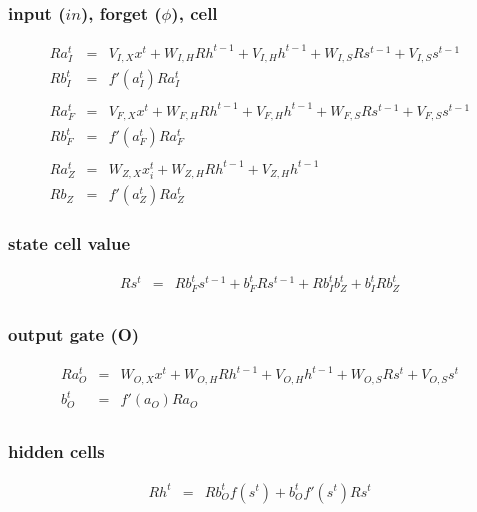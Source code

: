 \documentclass{article}
\begin{document}
\subsubsection{input ($in$), forget ($\phi$), cell}
\begin{eqnarray*}
Ra_{I}^t &=& V_{I,X}x^t + W_{I,H}Rh^{t-1} + V_{I,H}h^{t-1} + W_{I,S}Rs^{t-1} + V_{I,S}s^{t-1}\\
Rb_{I}^t &=& f'(a_{I}^t)Ra_{I}^t \\
\\
Ra_{F}^t &=& V_{F, X}x^t + W_{F, H}Rh^{t-1} + V_{F, H}h^{t-1} + W_{F, S}Rs^{t-1} + V_{F, S}s^{t-1} \\
Rb_{F}^t &=& f'(a_{F}^t) Ra_{F}^t \\
\\
Ra_{Z}^t &=& W_{Z,X}x_i^t + W_{Z,H} Rh^{t-1} + V_{Z,H} h^{t-1} \\
Rb_{Z} &=& f'(a_{Z}^t) Ra_{Z}^t 
\end{eqnarray*}


\subsubsection{state cell value}
\begin{eqnarray*}
Rs^t &=& Rb_{F}^ts^{t-1} + b_{F}^tRs^{t-1} + Rb_{I}^t b_Z^t + b_{I}^t Rb_Z^t \\  
\end{eqnarray*}

\subsubsection{output gate (O)}
\begin{eqnarray*}
Ra_{O}^t &=& W_{O,X}x^t + W_{O,H}Rh^{t-1} + V_{O,H}h^{t-1} + W_{O,S}Rs^t + V_{O,S}s^t \\
b_{O}^t &=& f'(a_{O})Ra_{O} \\
\end{eqnarray*}

\subsubsection{hidden cells}
\begin{eqnarray*}
Rh^t &=& Rb_{O}^t f(s^t) + b_{O}^t f'(s^t)Rs^t \\
\end{eqnarray*}

\end{document}
